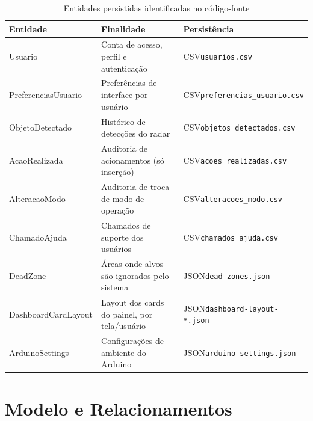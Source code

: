 \begin{table}[htbp]
  \centering
  \caption{Entidades persistidas identificadas no código-fonte}
  \label{tab:entidades}
  \small
  \renewcommand{\arraystretch}{1.2}
  \begin{tabular}{p{3.1cm}p{5.8cm}p{4.1cm}}
    \hline
    \textbf{Entidade} & \textbf{Finalidade} & \textbf{Persistência} \\
    \hline
    Usuario & Conta de acesso, perfil e autenticação & CSV\newline\scriptsize\texttt{usuarios.csv} \\
    PreferenciasUsuario & Preferências de interface por usuário &
    CSV\newline\scriptsize\texttt{preferencias\_}\allowbreak\texttt{usuario.csv} \\
    ObjetoDetectado & Histórico de detecções do radar &
    CSV\newline\scriptsize\texttt{objetos\_}\allowbreak\texttt{detectados.csv} \\
    AcaoRealizada & Auditoria de acionamentos (só inserção) &
    CSV\newline\scriptsize\texttt{acoes\_}\allowbreak\texttt{realizadas.csv} \\
    AlteracaoModo & Auditoria de troca de modo de operação &
    CSV\newline\scriptsize\texttt{alteracoes\_}\allowbreak\texttt{modo.csv} \\
    ChamadoAjuda & Chamados de suporte dos usuários &
    CSV\newline\scriptsize\texttt{chamados\_}\allowbreak\texttt{ajuda.csv} \\
    DeadZone & Áreas onde alvos são ignorados pelo sistema &
    JSON\newline\scriptsize\texttt{dead-zones.json} \\
    Dashboard\allowbreak CardLayout & Layout dos cards do painel, por tela/usuário &
    JSON\newline\scriptsize\texttt{dashboard-}\allowbreak\texttt{layout-*.json} \\
    ArduinoSettings & Configurações de ambiente do Arduino &
    JSON\newline\scriptsize\texttt{arduino-}\allowbreak\texttt{settings.json} \\
    \hline
  \end{tabular}
\end{table}

\section{Modelo e Relacionamentos}
\label{sec:modelo}

